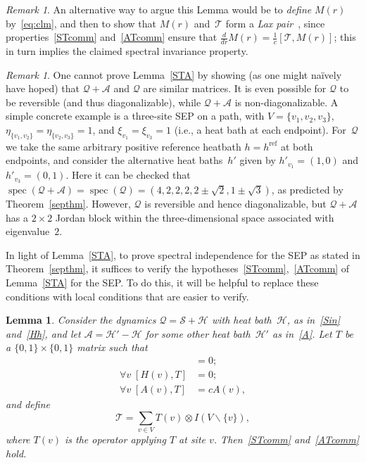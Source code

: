 \documentclass[11pt]{article}
\theoremstyle{plain}
\newtheorem{lemma}[theorem]{Lemma}
\theoremstyle{definition}
\theoremstyle{remark}
\newtheorem{remark}[theorem]{Remark}
\numberwithin{equation}{section}
\newcommand{\cA}{{\mathcal A}}
\newcommand{\cH}{{\mathcal H}}
\newcommand{\cS}{{\mathcal S}}
\newcommand{\cT}{{\mathcal T}}
\newcommand{\be}{\begin{equation}}
\newcommand{\ee}{\end{equation}}
\DeclareMathOperator{\spec}{spec}
\renewcommand{\cS}{{\mathcal Q}}
\newcommand{\cSin}{{\mathcal S}}
\newcommand{\hrf}{h^{\text{ref}}}
\begin{document}
\begin{remark} An alternative way to argue this Lemma would be to \emph{define} $M(r)$ by~\eqref{eq:clm}, and then to show that $M(r)$ and~$\cT$
form a {\it Lax pair}~\cite{Lax68}, since properties~\eqref{STcomm} and~\eqref{ATcomm} ensure that $\frac{d}{dr}M(r) =\frac{1}{c} [\cT,M(r)]$; this
in turn implies the claimed spectral invariance property.
\end{remark}

\begin{remark}
One cannot prove Lemma~\ref{STA} by showing (as one might na\"ively have hoped) that $\cS+\cA$ and $\cS$ are similar matrices. 
It is even possible for $\cS$ to be reversible (and thus diagonalizable), while $\cS+\cA$ is non-diagonalizable.
A simple concrete example is a three-site SEP on a path, with $V=\{v_1,v_2,v_3\}$, $\eta_{\{v_1,v_2\}}=\eta_{\{v_2,v_3\}}=1$,
and $\xi_{v_1}=\xi_{v_3}=1$ (i.e., a heat bath at each endpoint).  For~$\cS$ we take the same arbitrary positive reference heatbath $h=\hrf$
at both endpoints, and consider the alternative heat baths~$h'$ given by $h'_{v_1}=(1,0)$ and $h'_{v_3}=(0,1)$.  Here it can be checked that
$\spec(\cS+\cA)=\spec(\cS)=(4,2,2,2,2\pm \sqrt{2},1\pm \sqrt{3})$, 
as predicted
by Theorem~\ref{septhm}.  However, $\cS$ is reversible and hence diagonalizable, but 
$\cS+\cA$ has a $2 \times 2$ Jordan block within the three-dimensional space associated with eigenvalue~$2$.
\end{remark}


In light of Lemma~\ref{STA}, to prove spectral independence for the SEP as stated in Theorem~\ref{septhm}, 
it suffices to verify the hypotheses~\eqref{STcomm},~\eqref{ATcomm} of Lemma~\ref{STA} for the SEP.
To do this, it will be helpful to replace these conditions with local conditions that are easier to verify.

\begin{lemma} 
Consider the dynamics $\cS=\cSin+\cH$ with heat bath~$\cH$, as in~\eqref{Sin} and~\eqref{Hh},
and let $\cA=\cH'-\cH$ for some other heat bath~$\cH'$ as in~\eqref{A}.  Let $T$ be a $\{0,1\} \times \{0,1\}$ matrix such that 
\begin{align} [S,T\otimes I + I \otimes T]&=0 \label{STassump}; \\
\forall v \; [H(v),T]&=0; \label{HTassump} \\
\forall v \; [A(v),T]&=cA(v), \label{ATassump}
\end{align}
and define
\be \cT=\sum_{v \in V} T(v) \otimes I(V\backslash \{v\}), \label{T} \ee
where $T(v)$ is the operator applying $T$ at site $v$. 
Then~\eqref{STcomm} and~\eqref{ATcomm} hold.
\label{liftLemma} 
\end{lemma}
\end{document}
